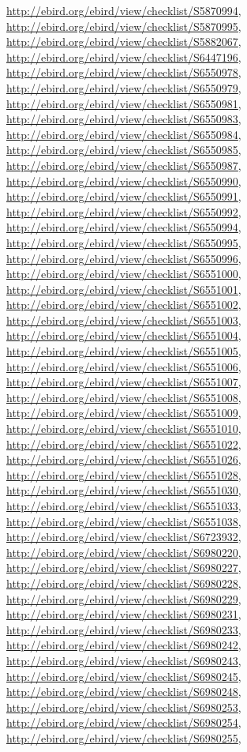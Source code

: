 \documentclass[9pt, article]{memoir}
\begin{document}
\begin{multicols}{2}
\url{http://ebird.org/ebird/view/checklist/S5870994}, 
\url{http://ebird.org/ebird/view/checklist/S5870995}, 
\url{http://ebird.org/ebird/view/checklist/S5882067}, 
\url{http://ebird.org/ebird/view/checklist/S6447196}, 
\url{http://ebird.org/ebird/view/checklist/S6550978}, 
\url{http://ebird.org/ebird/view/checklist/S6550979}, 
\url{http://ebird.org/ebird/view/checklist/S6550981}, 
\url{http://ebird.org/ebird/view/checklist/S6550983}, 
\url{http://ebird.org/ebird/view/checklist/S6550984}, 
\url{http://ebird.org/ebird/view/checklist/S6550985}, 
\url{http://ebird.org/ebird/view/checklist/S6550987}, 
\url{http://ebird.org/ebird/view/checklist/S6550990}, 
\url{http://ebird.org/ebird/view/checklist/S6550991}, 
\url{http://ebird.org/ebird/view/checklist/S6550992}, 
\url{http://ebird.org/ebird/view/checklist/S6550994}, 
\url{http://ebird.org/ebird/view/checklist/S6550995}, 
\url{http://ebird.org/ebird/view/checklist/S6550996}, 
\url{http://ebird.org/ebird/view/checklist/S6551000}, 
\url{http://ebird.org/ebird/view/checklist/S6551001}, 
\url{http://ebird.org/ebird/view/checklist/S6551002}, 
\url{http://ebird.org/ebird/view/checklist/S6551003}, 
\url{http://ebird.org/ebird/view/checklist/S6551004}, 
\url{http://ebird.org/ebird/view/checklist/S6551005}, 
\url{http://ebird.org/ebird/view/checklist/S6551006}, 
\url{http://ebird.org/ebird/view/checklist/S6551007}, 
\url{http://ebird.org/ebird/view/checklist/S6551008}, 
\url{http://ebird.org/ebird/view/checklist/S6551009}, 
\url{http://ebird.org/ebird/view/checklist/S6551010}, 
\url{http://ebird.org/ebird/view/checklist/S6551022}, 
\url{http://ebird.org/ebird/view/checklist/S6551026}, 
\url{http://ebird.org/ebird/view/checklist/S6551028}, 
\url{http://ebird.org/ebird/view/checklist/S6551030}, 
\url{http://ebird.org/ebird/view/checklist/S6551033}, 
\url{http://ebird.org/ebird/view/checklist/S6551038}, 
\url{http://ebird.org/ebird/view/checklist/S6723932}, 
\url{http://ebird.org/ebird/view/checklist/S6980220}, 
\url{http://ebird.org/ebird/view/checklist/S6980227}, 
\url{http://ebird.org/ebird/view/checklist/S6980228}, 
\url{http://ebird.org/ebird/view/checklist/S6980229}, 
\url{http://ebird.org/ebird/view/checklist/S6980231}, 
\url{http://ebird.org/ebird/view/checklist/S6980233}, 
\url{http://ebird.org/ebird/view/checklist/S6980242}, 
\url{http://ebird.org/ebird/view/checklist/S6980243}, 
\url{http://ebird.org/ebird/view/checklist/S6980245}, 
\url{http://ebird.org/ebird/view/checklist/S6980248}, 
\url{http://ebird.org/ebird/view/checklist/S6980253}, 
\url{http://ebird.org/ebird/view/checklist/S6980254}, 
\url{http://ebird.org/ebird/view/checklist/S6980255}, 

\end{multicols}
\end{document}
